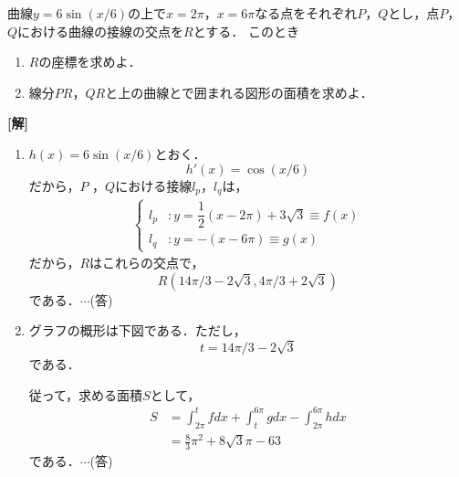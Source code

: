 \documentclass[a4j]{jarticle}
\begin{document}

     \begin{oframed}
     曲線$y=6\sin(x/6)$の上で$x=2\pi$，$x=6\pi$なる点をそれぞれ$P$，$Q$とし，点$P$，$Q$における曲線の接線の交点を$R$とする．
     このとき
          \begin{enumerate}[(1)]
          \item $R$の座標を求めよ．
          \item 線分$PR$，$QR$と上の曲線とで囲まれる図形の面積を求めよ．
          \end{enumerate}
     \end{oframed}

\setlength{\columnseprule}{0.4pt}
\begin{multicols}{2}
{\bf[解]} 
     \begin{enumerate}[(1)]
     \item $h(x)=6\sin(x/6)$とおく．
          \[h'(x)=\cos(x/6)\]
     だから，$P$ ，$Q$における接線$l_p$，$l_q$は，
          \begin{align*}
               \begin{cases}
               l_p&:y=\dfrac{1}{2}(x-2\pi)+3\sqrt{3}\equiv f(x) \\
               l_q&:y=-(x-6\pi)\equiv g(x)
               \end{cases}
          \end{align*}
     だから，$R$はこれらの交点で，
          \[R(14\pi/3-2\sqrt{3},4\pi/3+2\sqrt{3})\]
     である．$\cdots$(答)
     
     \item グラフの概形は下図である．ただし，
          \[t=14\pi/3-2\sqrt{3}\]
     である．
          \begin{center}
          \scalebox{1}{}
          \end{center}
     従って，求める面積$S$として，
          \begin{align}
          S&=\int_{2\pi}^tfdx+\int_t^{6\pi}gdx-\int_{2\pi}^{6\pi}hdx \nonumber\\
          &=\frac{8}{3}\pi^2+8\sqrt{3}\pi-63\nonumber
          \end{align}
     である．$\cdots$(答)
     \end{enumerate}
\newpage
\end{multicols}
\end{document}
